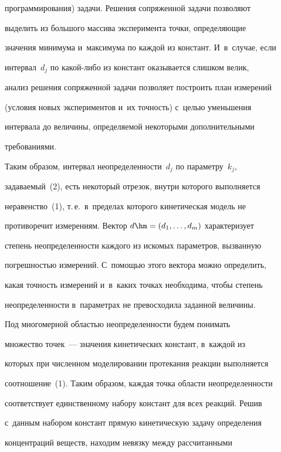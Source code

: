 программирования) задачи. Решения сопряженной задачи позволяют 

выделить из большого массива эксперимента точки, определяющие 

значения минимума и~максимума по каждой из констант. И~в~случае, если 

интервал~$d_j$ по ка\-кой-ли\-бо из констант оказывается слишком велик, 

анализ решения сопряженной задачи позволяет построить план измерений 

(условия новых экспериментов и~их точность) с~целью уменьшения 

интервала до величины, определяемой некоторыми дополнительными 

требованиями. 

{



}

  

  Таким образом, интервал неопределенности~$d_j$ по параметру~$k_j$, 

за\-да\-ва\-емый~(2), есть некоторый отрезок, внутри которого выполняется 

неравенство~(1), т.\,е.\ в~пределах которого кинетическая модель не 

противоречит измерениям. Вектор $d\hm=(d_1, \ldots, d_m)$ характеризует 

степень неопределенности каждого из искомых параметров, вызванную 

погрешностью измерений. С~по\-мощью этого вектора можно определить, 

какая точность измерений и~в~каких точках необходима, чтобы степень 

неопределенности в~параметрах не превосходила заданной величины.

  

  Под многомерной областью неопределенности будем понимать 

множество точек~--- значения кинетических констант, в~каждой из 

которых при численном моделировании протекания реакции выполняется 

соотношение~(1). Таким образом, каждая точка области неопределенности 

соответствует единственному набору констант для всех реакций. Решив 

с~данным набором констант прямую кинетическую задачу определения 

концентраций веществ, находим невязку между рассчитанными 

